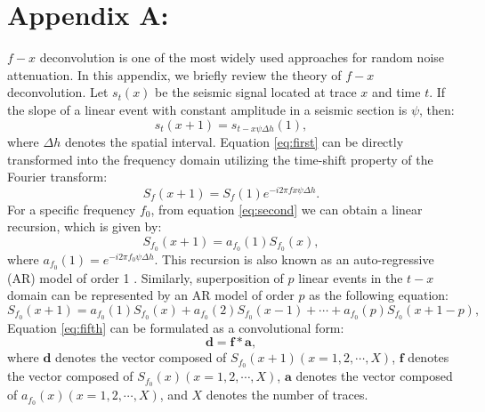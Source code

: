 
\section{Appendix A: }
$f-x$ deconvolution is one of the most widely used approaches for random noise attenuation. In this appendix, we briefly review the theory of $f-x$ deconvolution. Let $s_t(x)$ be the seismic signal located at trace $x$ and time $t$. If the slope of a linear event with constant amplitude in a seismic section is $\psi$, then:
\begin{equation}
\label{eq:first}
s_t(x+1)=s_{t-x\psi\Delta h}(1),
\end{equation}
where $\Delta h$ denotes the spatial interval. Equation \ref{eq:first} can be directly transformed into the frequency domain utilizing the time-shift property of the Fourier transform:
\begin{equation}
\label{eq:second}
S_f(x+1)=S_f(1)e^{-i2\pi fx\psi\Delta h}.
\end{equation}
For a specific frequency $f_0$,  from equation \ref{eq:second} we can  obtain a linear recursion, which is given by:
\begin{equation}
\label{eq:third}
S_{f_0}(x+1)=a_{f_0}(1)S_{f_0}(x),
\end{equation}
where  $a_{f_0}(1)=e^{-i2\pi f_0\psi\Delta h}$. 
This recursion is also known as an auto-regressive (AR) model of order 1 \cite[]{canales}. Similarly, superposition of $p$ linear events in the $t-x$ domain can be represented by an AR model of order $p$ \cite[]{tufts,har} as the following equation:
\begin{equation}
\label{eq:fifth}
S_{f_0}(x+1)=a_{f_0}(1)S_{f_0}(x)+a_{f_0}(2)S_{f_0}(x-1)+\cdots+a_{f_0}(p)S_{f_0}(x+1-p),
\end{equation}
Equation \ref{eq:fifth} can be formulated as a convolutional form:
\begin{equation}
\label{eq:sixth}
\mathbf{d}=\mathbf{f}*\mathbf{a},
\end{equation}
where $\mathbf{d}$ denotes the vector composed of $S_{f_0}(x+1)(x=1,2,\cdots,X)$, $\mathbf{f}$ denotes the vector composed of $S_{f_0}(x)(x=1,2,\cdots,X)$, $\mathbf{a}$ denotes the vector composed of $a_{f_0}(x)(x=1,2,\cdots,X)$, and $X$ denotes the number of traces.

